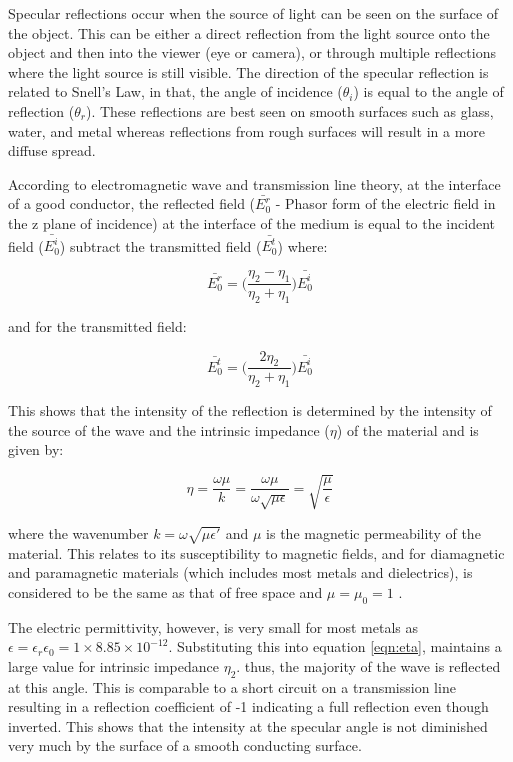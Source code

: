 \documentclass[fleqn,twoside]{article}
\begin{document}
Specular reflections occur when the source of light can be seen on the surface of the object. This can be either a direct reflection from the light source onto the object and then into the viewer (eye or camera), or through multiple reflections where the light source is still visible. The direction of the specular reflection is related to Snell's Law, in that, the angle of incidence ($\theta_i$) is equal to the angle of reflection ($\theta_r$). These reflections are best seen on smooth surfaces such as glass, water, and metal whereas reflections from rough surfaces will result in a more diffuse spread.   

According to electromagnetic wave and transmission line theory, at the interface of a good conductor, the reflected field ($\bar{E_0^r}$ - Phasor form of the electric field in the z plane of incidence) at the interface of the medium is equal to the incident field ($\bar{E_0^i}$) subtract the transmitted field ($\bar{E_0^t}$) \cite{ulaby} where:

\begin{equation}
\bar{E_0^r} = \bigg(\frac{\eta_2 - \eta_1}{\eta_2 + \eta_1}\bigg)\bar{E_0^i}
\end{equation}

and for the transmitted field:

\begin{equation}
\bar{E_0^t} = \bigg(\frac{2\eta_2}{\eta_2 + \eta_1}\bigg)\bar{E_0^i}
\end{equation}


This shows that the intensity of the reflection is determined by the intensity of the source of the wave and the intrinsic impedance ($\eta$) of the material and is given by:

\begin{equation}
\eta = \frac{\omega \mu}{k} = \frac{\omega \mu}{\omega \sqrt{\mu \epsilon}}= \sqrt{\frac{\mu}{\epsilon}}
\label{eqn:eta}
\end{equation}

where the wavenumber $k = \omega \sqrt{\mu \epsilon'}$ and $\mu$ is the magnetic permeability of the material. This relates to its susceptibility to magnetic fields, and for diamagnetic and paramagnetic materials (which includes most metals and dielectrics), is considered to be the same as that of free space and $\mu = \mu_0 = 1$ \cite{ulaby}. 

The electric permittivity, however, is very small for most metals as $\epsilon = \epsilon_r \epsilon_0 = 1 \times 8.85\times10^{-12}$. Substituting this into equation \ref{eqn:eta}, maintains a large value for intrinsic impedance $\eta_2$. thus, the majority of the wave is reflected at this angle. This is comparable to a short circuit on a transmission line resulting in a reflection coefficient of -1 indicating a full reflection even though inverted. This shows that the intensity at the specular angle is not diminished very much by the surface of a smooth conducting surface.
\end{document}
